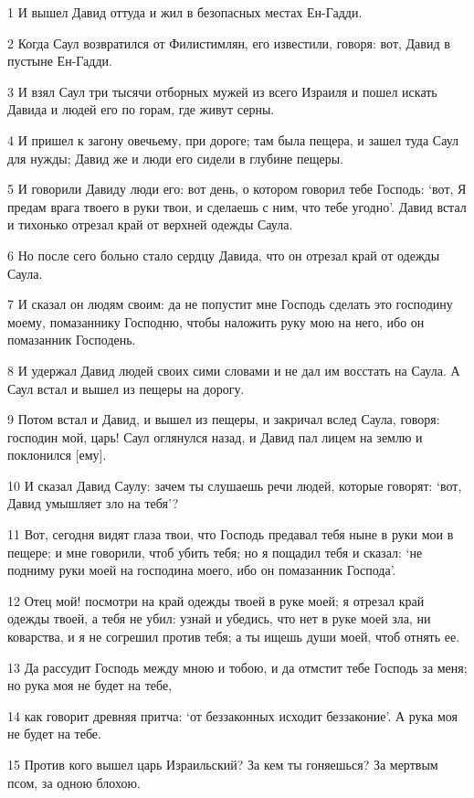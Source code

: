 \par 1 И вышел Давид оттуда и жил в безопасных местах Ен-Гадди.
\par 2 Когда Саул возвратился от Филистимлян, его известили, говоря: вот, Давид в пустыне Ен-Гадди.
\par 3 И взял Саул три тысячи отборных мужей из всего Израиля и пошел искать Давида и людей его по горам, где живут серны.
\par 4 И пришел к загону овечьему, при дороге; там была пещера, и зашел туда Саул для нужды; Давид же и люди его сидели в глубине пещеры.
\par 5 И говорили Давиду люди его: вот день, о котором говорил тебе Господь: `вот, Я предам врага твоего в руки твои, и сделаешь с ним, что тебе угодно'. Давид встал и тихонько отрезал край от верхней одежды Саула.
\par 6 Но после сего больно стало сердцу Давида, что он отрезал край от одежды Саула.
\par 7 И сказал он людям своим: да не попустит мне Господь сделать это господину моему, помазаннику Господню, чтобы наложить руку мою на него, ибо он помазанник Господень.
\par 8 И удержал Давид людей своих сими словами и не дал им восстать на Саула. А Саул встал и вышел из пещеры на дорогу.
\par 9 Потом встал и Давид, и вышел из пещеры, и закричал вслед Саула, говоря: господин мой, царь! Саул оглянулся назад, и Давид пал лицем на землю и поклонился [ему].
\par 10 И сказал Давид Саулу: зачем ты слушаешь речи людей, которые говорят: `вот, Давид умышляет зло на тебя'?
\par 11 Вот, сегодня видят глаза твои, что Господь предавал тебя ныне в руки мои в пещере; и мне говорили, чтоб убить тебя; но я пощадил тебя и сказал: `не подниму руки моей на господина моего, ибо он помазанник Господа'.
\par 12 Отец мой! посмотри на край одежды твоей в руке моей; я отрезал край одежды твоей, а тебя не убил: узнай и убедись, что нет в руке моей зла, ни коварства, и я не согрешил против тебя; а ты ищешь души моей, чтоб отнять ее.
\par 13 Да рассудит Господь между мною и тобою, и да отмстит тебе Господь за меня; но рука моя не будет на тебе,
\par 14 как говорит древняя притча: `от беззаконных исходит беззаконие'. А рука моя не будет на тебе.
\par 15 Против кого вышел царь Израильский? За кем ты гоняешься? За мертвым псом, за одною блохою.
